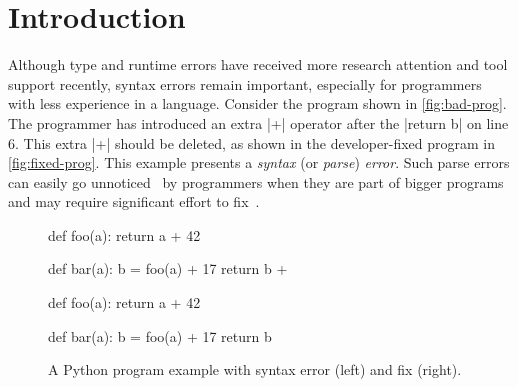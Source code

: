 
\section{Introduction}
\label{sec:intro}

Although type and runtime errors have received more research
attention and tool support recently, syntax errors remain important, especially for
programmers with less experience in a language. 
Consider the program shown in \autoref{fig:bad-prog}. 
The programmer has introduced an extra |+| operator after the
|return b| on line 6. This extra |+| should be deleted, as shown in the
developer-fixed program in \autoref{fig:fixed-prog}. This
example presents a \emph{syntax} (or \emph{parse}) \emph{error}. Such parse errors can easily
go unnoticed~\citep{Denny_2012, Ahadi_2018} by programmers when they are part of
bigger programs and may require significant effort to fix~\citep{Kummerfeld2003}.


\begin{figure}[h]
\centering
\begin{minipage}[c]{0.48\linewidth}
\begin{ecode}
def foo(a):
  return a + 42

def bar(a):
  b = foo(a) + 17
  return b +
\end{ecode}
\label{fig:bad-prog}
\end{minipage}%
\hspace{0.02\linewidth}%
\begin{minipage}[c]{0.48\linewidth}
\begin{ecode}
def foo(a):
  return a + 42

def bar(a):
  b = foo(a) + 17
  return b
\end{ecode}
\label{fig:fixed-prog}
\end{minipage}
\caption{A Python program example with syntax error (left) and fix (right).}
\label{fig:example-prog}
\end{figure}

